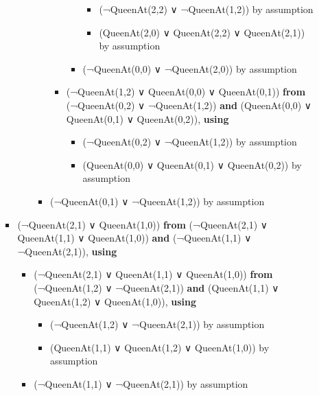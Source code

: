 \begin{itemize}
\begin{itemize}
\begin{itemize}
\begin{itemize}
\begin{itemize}
\begin{itemize}
\begin{itemize}
              \begin{itemize}
              \tightlist
              \item
                (¬QueenAt(2,2) ∨ ¬QueenAt(1,2)) by assumption
              \item
                (QueenAt(2,0) ∨ QueenAt(2,2) ∨ QueenAt(2,1)) by
                assumption
              \end{itemize}
            \item
              (¬QueenAt(0,0) ∨ ¬QueenAt(2,0)) by assumption
            \end{itemize}
          \item
            (¬QueenAt(1,2) ∨ QueenAt(0,0) ∨ QueenAt(0,1)) \textbf{from}
            (¬QueenAt(0,2) ∨ ¬QueenAt(1,2)) \textbf{and} (QueenAt(0,0) ∨
            QueenAt(0,1) ∨ QueenAt(0,2)), \textbf{using}

            \begin{itemize}
            \tightlist
            \item
              (¬QueenAt(0,2) ∨ ¬QueenAt(1,2)) by assumption
            \item
              (QueenAt(0,0) ∨ QueenAt(0,1) ∨ QueenAt(0,2)) by assumption
            \end{itemize}
          \end{itemize}
        \item
          (¬QueenAt(0,1) ∨ ¬QueenAt(1,2)) by assumption
        \end{itemize}
      \end{itemize}
    \item
      (¬QueenAt(2,1) ∨ QueenAt(1,0)) \textbf{from} (¬QueenAt(2,1) ∨
      QueenAt(1,1) ∨ QueenAt(1,0)) \textbf{and} (¬QueenAt(1,1) ∨
      ¬QueenAt(2,1)), \textbf{using}

      \begin{itemize}
      \tightlist
      \item
        (¬QueenAt(2,1) ∨ QueenAt(1,1) ∨ QueenAt(1,0)) \textbf{from}
        (¬QueenAt(1,2) ∨ ¬QueenAt(2,1)) \textbf{and} (QueenAt(1,1) ∨
        QueenAt(1,2) ∨ QueenAt(1,0)), \textbf{using}

        \begin{itemize}
        \tightlist
        \item
          (¬QueenAt(1,2) ∨ ¬QueenAt(2,1)) by assumption
        \item
          (QueenAt(1,1) ∨ QueenAt(1,2) ∨ QueenAt(1,0)) by assumption
        \end{itemize}
      \item
        (¬QueenAt(1,1) ∨ ¬QueenAt(2,1)) by assumption
      \end{itemize}
    \end{itemize}
  \end{itemize}
\end{itemize}


